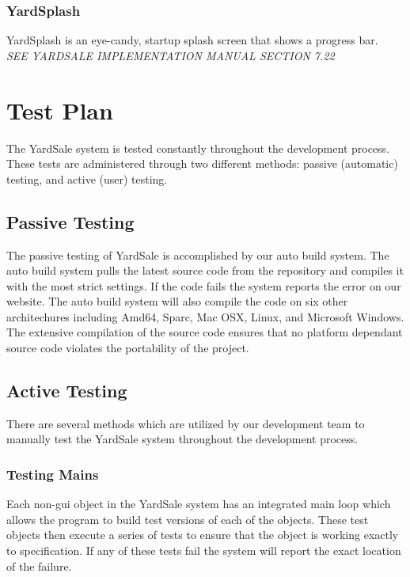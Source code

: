 \documentclass{report}
\begin{document}
\begin{itemize}
        \subsection{YardSplash}
        YardSplash is an eye-candy, startup splash screen that shows a
        progress bar.\\
        {\sl SEE YARDSALE IMPLEMENTATION MANUAL SECTION 7.22}

\chapter{Test Plan}
The YardSale system is tested constantly throughout the
development process.  These tests are administered through two
different methods: passive (automatic) testing, and active (user)
testing.

    \section{Passive Testing}

    The passive testing of YardSale is accomplished by our auto build system.  The auto build system pulls the latest source
    code from the repository and compiles it with the most strict settings.  If the code fails the system reports the error
    on our website.  The auto build system will also compile the code on six other architechures including Amd64, Sparc, Mac OSX,
    Linux, and Microsoft Windows.  The extensive compilation of the source code ensures that no platform dependant source code
    violates the portability of the project.

    \section{Active Testing}
    There are several methods which are utilized by our
    development team to manually test the YardSale system
    throughout the development process.
        \subsection{Testing Mains}
        Each non-gui object in the YardSale system has an integrated main loop which allows the program to build test versions of
        each of the objects.  These test objects then execute a series of tests to ensure that the object is working exactly to specification.
        If any of these tests fail the system will report the exact location of the failure.


\end{itemize}
\end{document}
